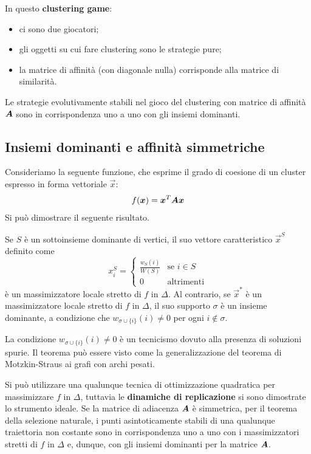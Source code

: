 In questo \textbf{clustering game}:
\begin{itemize}
	\item ci sono due giocatori;
	\item gli oggetti su cui fare clustering sono le strategie pure;
	\item la matrice di affinità (con diagonale nulla) corrisponde alla matrice di similarità.
\end{itemize}

\begin{thm}
	Le strategie evolutivamente stabili nel gioco del clustering con matrice di affinità $\mat{A}$ sono in corrispondenza uno a uno con gli insiemi dominanti.
\end{thm}

\subsection{Insiemi dominanti e affinità simmetriche}

Consideriamo la seguente funzione, che esprime il grado di coesione di un cluster espresso in forma vettoriale $\vec{x}$:
\begin{displaymath}
	f(\vec{x}) = \vec{x}^T \mat{A} \vec{x}
\end{displaymath}
Si può dimostrare il seguente risultato.
\begin{thm}
	Se $S$ è un sottoinsieme dominante di vertici, il suo vettore caratteristico $\vec{x}^S$ definito come
	\begin{displaymath}
		x^S_i = \begin{cases}
			\frac{w_S(i)}{W(S)} & \text{se } i \in S \\
			0 & \text{altrimenti}
		\end{cases}
	\end{displaymath}
	è un massimizzatore locale stretto di $f$ in $\Delta$.
	Al contrario, se $\vec{x}^*$ è un massimizzatore locale stretto di $f$ in $\Delta$, il suo supporto $\sigma$ è un insieme dominante, a condizione che $w_{\sigma \cup \{i\}}(i) \neq 0$ per ogni $i \notin \sigma$.
\end{thm}
\noindent La condizione $w_{\sigma \cup \{i\}}(i) \neq 0$ è un tecnicismo dovuto alla presenza di soluzioni spurie. Il teorema può essere visto come la generalizzazione del teorema di Motzkin-Straus ai grafi con archi pesati.

Si può utilizzare una qualunque tecnica di ottimizzazione quadratica per massimizzare $f$ in $\Delta$, tuttavia le \textbf{dinamiche di replicazione} si sono dimostrate lo strumento ideale. Se la matrice di adiacenza $\mat{A}$ è simmetrica, per il teorema della selezione naturale, i punti asintoticamente stabili di una qualunque traiettoria non costante sono in corrispondenza uno a uno con i massimizzatori stretti di $f$ in $\Delta$ e, dunque, con gli insiemi dominanti per la matrice $\mat{A}$.

